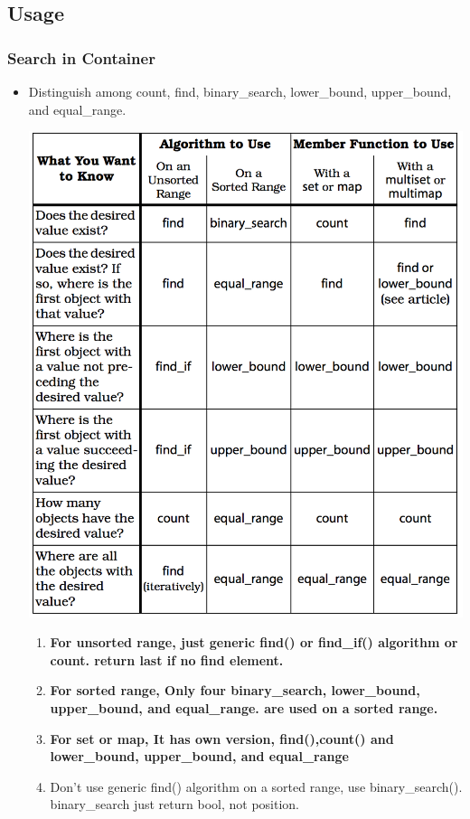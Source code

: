 \documentclass[a4paper,11pt,twoside]{book}
\begin{document}
\subsection{Usage}
\subsubsection{Search in Container}
\begin{itemize}
\item Distinguish among count, find, binary\_search, lower\_bound, upper\_bound, and equal\_range.

\includegraphics[scale=0.6]{pics/distinguish.png}

\begin{enumerate}
\item \textbf{For unsorted range, just generic find() or find\_if() algorithm or  count. return last if no find element.}
\item \textbf{For sorted range, Only four binary\_search, lower\_bound, upper\_bound, and equal\_range. are used on a sorted range.}
\item \textbf{For set or map, It has own version, find(),count() and lower\_bound, upper\_bound, and equal\_range}
\item Don't use generic find() algorithm on a sorted range,  use binary\_search(). binary\_search just return bool, not position.


\end{enumerate}
\end{itemize}
\end{document}
